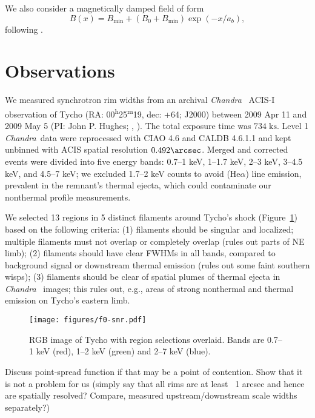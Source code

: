 \documentclass[12pt,preprint]{aastex}  %
\newcommand*{\mt}{\mathrm}
\newcommand*{\unit}[1]{\;\mt{#1}}  %
\newcommand*{\tsup}{\textsuperscript}
\newcommand*{\Chandra}{\textit{Chandra}\ }
\begin{document}
We also consider a magnetically damped field of form
\[
    B(x) = B_{\mt{min}} + \left(B_0 + B_{\mt{min}}\right) \exp\left(-x / a_b\right) ,
\]
following .


\section{Observations}

We measured synchrotron rim widths from an archival \Chandra
ACIS-I observation of Tycho
(RA: 00\tsup{h}25\tsup{m}19, dec: +64; J2000)
between 2009 Apr 11 and 2009 May 5 (PI: John P. Hughes;
,
).
The total exposure time was $734 \unit{ks}$.
Level 1 \Chandra data were reprocessed with CIAO 4.6 and CALDB 4.6.1.1 and kept
unbinned with ACIS spatial resolution $0.492\arcsec$.
Merged and corrected events were divided into five energy bands:
0.7--1 keV, 1--1.7 keV, 2--3 keV, 3--4.5 keV, and 4.5--7 keV;
we excluded 1.7--2 keV counts to avoid  (He$\alpha$) line
emission, prevalent in the remnant's thermal ejecta, which could contaminate
our nonthermal profile measurements.

We selected 13 regions in 5 distinct filaments around Tycho's shock
(Figure~\ref{fig:snr}) based on the following criteria:
(1) filaments should be singular and localized; multiple filaments must not
overlap or completely overlap (rules out parts of NE limb);
(2) filaments should have clear FWHMs in all bands, compared to background
signal or downstream thermal emission (rules out some faint southern wisps);
(3) filaments should be clear of spatial plumes of thermal ejecta in \Chandra
images; this rules out, e.g., areas of strong nonthermal and thermal emission
on Tycho's eastern limb.

\begin{figure}
    \centering
    \texttt{[image: figures/f0-snr.pdf]}
    \caption{RGB image of Tycho with region selections overlaid.  Bands are
    0.7--1 keV (red), 1--2 keV (green) and 2--7 keV (blue).
    }
    \label{fig:snr}
\end{figure}

Discuss point-spread function if that may be a point of contention.
Show that it is not a problem for us (simply say that all rims are at
least ~1 arcsec and hence are spatially resolved? Compare,
\citet{bamba2005-hist} measured upstream/downstream scale widths separately?)
\end{document}
